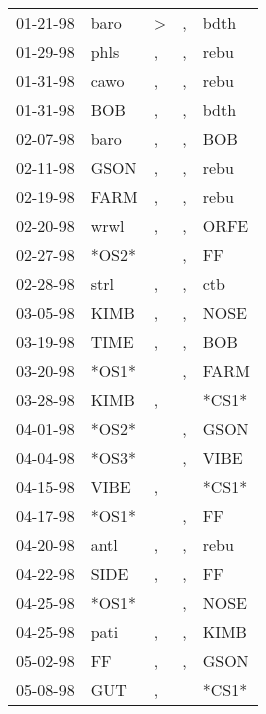 \begin{supertabular}{lllll}
 01-21-98 &   baro &     \textgreater &                , &   bdth \\
 01-29-98 &   phls &                , &                , &   rebu \\
 01-31-98 &   cawo &                , &                , &   rebu \\
 01-31-98 &    BOB &                , &                , &   bdth \\
 02-07-98 &   baro &                , &                , &    BOB \\
 02-11-98 &   GSON &                , &                , &   rebu \\
 02-19-98 &   FARM &                , &                , &   rebu \\
 02-20-98 &   wrwl &                , &                , &   ORFE \\
 02-27-98 &  *OS2* &                  &                , &     FF \\
 02-28-98 &   strl &                , &                , &    ctb \\
 03-05-98 &   KIMB &                , &                , &   NOSE \\
 03-19-98 &   TIME &                , &                , &    BOB \\
 03-20-98 &  *OS1* &                  &                , &   FARM \\
 03-28-98 &   KIMB &                , &                  &  *CS1* \\
 04-01-98 &  *OS2* &                  &                , &   GSON \\
 04-04-98 &  *OS3* &                  &                , &   VIBE \\
 04-15-98 &   VIBE &                , &                  &  *CS1* \\
 04-17-98 &  *OS1* &                  &                , &     FF \\
 04-20-98 &   antl &                , &                , &   rebu \\
 04-22-98 &   SIDE &                , &                , &     FF \\
 04-25-98 &  *OS1* &                  &                , &   NOSE \\
 04-25-98 &   pati &                , &                , &   KIMB \\
 05-02-98 &     FF &                , &                , &   GSON \\
 05-08-98 &    GUT &                , &                  &  *CS1* \\

\end{supertabular}
